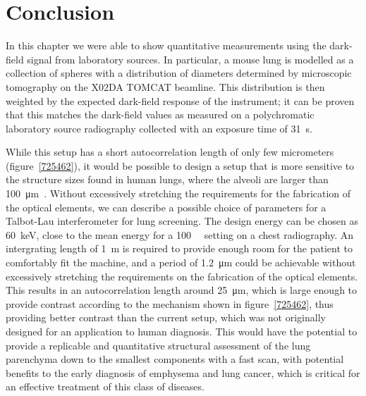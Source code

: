 \section{Conclusion}
In this chapter we were able to show quantitative measurements using the
dark-field signal from laboratory sources. In particular, a mouse lung is
modelled as a collection of spheres with a distribution of diameters determined
by microscopic tomography on the X02DA TOMCAT beamline. This distribution is
then weighted by the expected dark-field response of the instrument; it can
be proven that this matches the dark-field values as measured on a
polychromatic laboratory source radiography collected with an exposure time
of \SI{31}{\second}.

While this setup has a short autocorrelation length of only few micrometers
(figure~\ref{725462}), it would be possible to design a setup that is more
sensitive to the structure sizes found in human lungs, where the alveoli are
larger than
\SI{100}{\micro\meter}~\parencite{doi:10.1164/rccm.200308-1107OC}. Without excessively stretching the
requirements for the fabrication of the optical elements, we can describe a
possible choice of parameters for a Talbot-Lau interferometer for lung
screening. The design energy can be chosen as \SI{60}{\kilo\eV}, close to
the mean energy for a \SI{100}{\kilo\voltpeak} setting on a chest
radiography. An intergrating length of \SI{1}{\meter} is required to provide
enough room for the patient to comfortably fit the machine,
and a period of \SI{1.2}{\micro\meter} could be achievable without
excessively stretching the requirements on the fabrication of the optical
elements. This results in an autocorrelation length around
\SI{25}{\micro\meter}, which is large enough to provide contrast according
to the mechanism shown in figure~\ref{725462}, thus providing better contrast than the
current setup, which was not originally designed for an application to human
diagnosis.
This would have the potential to provide a replicable and quantitative
structural assessment of the lung parenchyma down to the smallest components
with a fast scan, with potential benefits to the early diagnosis of
emphysema and lung cancer, which is critical for an effective treatment of
this class of diseases.
